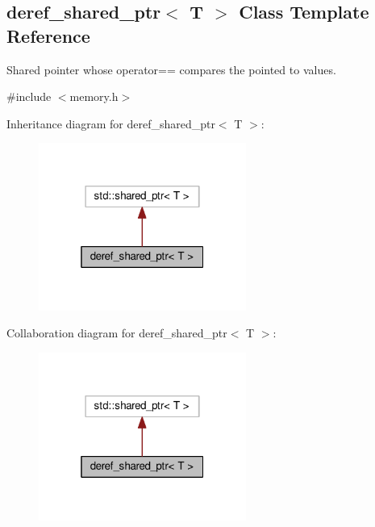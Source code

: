 \hypertarget{classderef__shared__ptr}{}\subsection{deref\+\_\+shared\+\_\+ptr$<$ T $>$ Class Template Reference}
\label{classderef__shared__ptr}


Shared pointer whose {\ttfamily operator==} compares the pointed to values.  




{\ttfamily \#include $<$memory.\+h$>$}



Inheritance diagram for deref\+\_\+shared\+\_\+ptr$<$ T $>$\+:\nopagebreak
\begin{figure}[H]
\begin{center}
\leavevmode
\includegraphics[width=193pt]{classderef__shared__ptr__inherit__graph}
\end{center}
\end{figure}


Collaboration diagram for deref\+\_\+shared\+\_\+ptr$<$ T $>$\+:\nopagebreak
\begin{figure}[H]
\begin{center}
\leavevmode
\includegraphics[width=193pt]{classderef__shared__ptr__coll__graph}
\end{center}
\end{figure}
